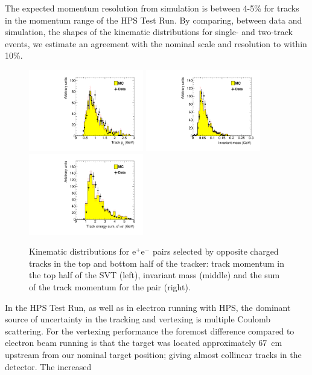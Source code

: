 \documentclass[final,3p,times,twocolumn]{elsarticle}
\newcommand{\ee}{e$^+$e$^-$}
\begin{document}
The expected momentum resolution from simulation is between 4-5\% for tracks in the momentum 
range of the HPS Test Run. By comparing, between data and simulation, the shapes of the kinematic 
distributions for single- and two-track events, we estimate an agreement with the nominal scale and 
resolution to within 10\%.
 \begin{center}
{\small
\begin{figure}[t]
   \includegraphics[width=5cm]{figures/h_trk_top_px_h_trk_top_px_trigsel4hit_pair1351_twotrkfilt-v6-paper}
   \includegraphics[width=5cm]{figures/h_invM_h_invM_trigsel4hit_pair1351_twotrkfilt-v6-paper}
   \includegraphics[width=5cm]{figures/h_sumE_h_sumE_trigsel4hit_pair1351_twotrkfilt-v6-paper}
\caption{Kinematic distributions for \ee{} pairs selected by opposite charged tracks in the top and bottom half of the tracker: track momentum in the top half of the SVT (left), invariant mass (middle) and the sum of the track momentum for the pair (right).}
\label{fig:pair_kin}
\end{figure}
}
\end{center}
In the HPS Test Run, as well as in electron running with HPS, the dominant source of uncertainty in the 
tracking and vertexing is multiple Coulomb scattering. For the vertexing performance the foremost 
difference compared to electron beam running is that the target was located approximately 67~cm 
upstream from our nominal target position; giving almost collinear tracks in the detector. The increased 
\end{document}
